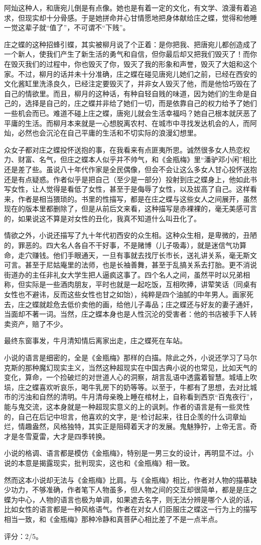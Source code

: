 阿灿这种人，和唐宛儿倒是有点像。她也是有着一定的文化，有文学、浪漫有着追求，但现实却十分骨感。于是她拼命并心甘情愿地把身体献给庄之蝶，觉得和他睡一觉这辈子就“值了”，不可谓不“下贱”。

庄之蝶的这种招蜂引蝶，其实被柳月说了个正着：是你把我、把唐宛儿都创造成了一个新人，使我们产生了新生活的勇气和自信，但你最后却又把我们毁灭了！而你在毁灭我们的过程中，你也毁灭了你，毁灭了我的形象和声誉，毁灭了大姐和这个家。不过，柳月的话并未十分准确，庄之蝶在碰见唐宛儿她们之前，已经在西安的文化酱缸里洗涤良久，已经注定要毁灭了，并非女人毁灭了他，而是他恰巧毁在了自己的情欲里。而且，柳月的这种话，有种自轻自贱的味道，因为她们的生命是自己的，选择是自己的，庄之蝶并非给了她们一切，而是依靠自己的权力给予了她们一些机会而已。难道不碰上庄之蝶，唐宛儿就会生活幸福吗？她自己根本就厌恶了平庸的生活。而柳月本来就是一心想脱离农村、在城市中寻找发达机会的人，而阿灿，必然也会沉沦在自己平庸的生活和不切实际的浪漫幻想里。

众女子都对庄之蝶投怀送抱的事，在我看来有点匪夷所思。诚然很多女人热恋权力、财富、名气，但庄之蝶本人似乎并不帅气，和《金瓶梅》里“潘驴邓小闲”相比还是差了些。虽说八十年代作家是全民偶像，但会不会让这么多女人甘心投怀送抱还是有点疑惑。作者似乎是把自己（至少是一部分）投射到庄之蝶身上，他如此书写女性，让人觉得是看低了女性，甚至于是侮辱了女性，以及拔高了自己。这样看来，作者是相当猥琐的。书里的性描写，都是在庄之蝶与这些女人之间展开，虽然现在的版本里都删除了，但是从前后文来看，这种描写是赤裸裸的，毫无美感可言的，如果说这不算是对女性的丑化，我真不知道什么叫丑化了。

情欲之外，小说还描写了九十年代初西安的众生相。这种众生相，是卑微的，丑陋的，罪恶的。四大名人各自不干好事，不是赌博（儿子吸毒），就是迷信气功算命，走穴赚钱。他们手眼通天，一旦有事就去找厅长市长，送礼讲关系，毫无斯文可言。甚至于尼姑庵里的法师，也是长袖善舞，甚至于乱搞关系去打胎。更不消说街道办的主任非礼女大学生把人逼疯这事了。四个名人之间，虽然平时以兄弟相称，但实际是一些酒肉朋友，平时也就是一起吃饭，互相吹捧，讲荤笑话（同桌有女性也不避讳，反而这些女性也甘之如饴），纯粹是四个油腻的中年男人。画家死去，庄之蝶就趁危去低价卖他的画，给他儿子毒品；庄之蝶还与好友的妻子通奸，当面却不著一词。当然，庄之蝶本身也是人性沉沦的受害者：他的书店被手下人转卖资产，赔了不少。

最终东窗事发，牛月清知情后离家出走，庄之蝶死在车站。

小说的语言是细密的，全是《金瓶梅》那样的白描。除此之外，小说还学习了马尔克斯的那种魔幻现实主义，当然这种超现实在中国古典小说的也常见，比如天气的变化，算命，一个捡破烂的对世道人心的洞察，胡言乱语中透露着智慧。城墙上吹埙，庄之蝶喜欢听哀乐，喝牛乳房下的奶等等。以至于，牛都有了思想，去对比城市的污浊和自然的清明。牛月清母亲晚上睡在棺材上，自称看到西京“百鬼夜行”，能与鬼交流，这本身就是一种超现实意义的上的讽刺。作者的语言是有一些灵性的，自己在后记中坦言，他喜欢的文字，是“检讨起来，往日企羡的什么词章灿烂，情趣盎然，风格独特，其实正是阻碍着天才的发展。鬼魅狰狞，上帝无言。奇才是冬雪夏雷，大才是四季转换。

小说的格调、语言都是模仿《金瓶梅》，特别是一男三女的设计，再明显不过。小说的本意是揭露现实，批判现实，这也和《金瓶梅》相一致。

然而这本小说却无法与《金瓶梅》比肩。与《金瓶梅》相比，作者对人物的描摹缺少功力，不够准确，作者笔下人物虽多，但人物之间的交互却很简单，都是是庄之蝶为中心，人物的语言也极为单调，如果遮去名字，则无法分辨是哪个人说的话，比如女性的语言都是一种风格语气。作者在对女人们臣服庄之蝶这一行为上的描写相当一致，和《金瓶梅》那种冷静和真菩萨心相比差了不是一点半点。

评分：2/5。
